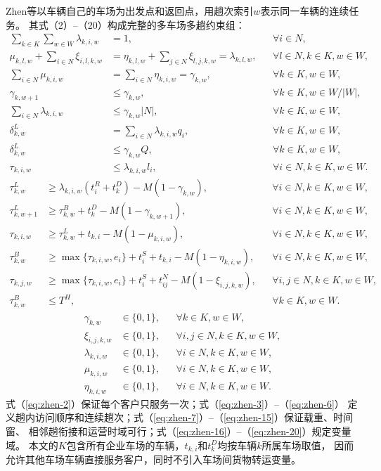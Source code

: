 Zhen等\cite{ref:44}以车辆自己的车场为出发点和返回点，用趟次索引$w$表示同一车辆的连续任务。
其式（2）--（20）构成完整的多车场多趟约束组：
\begin{align}
\sum_{k\in K}\sum_{w\in W}\lambda_{k,i,w}&=1,
&&\forall i\in N,
\label{eq:zhen-2}\\
\mu_{k,l,w}+\sum_{i\in N}\xi_{i,l,k,w}
&=\eta_{k,l,w}+\sum_{j\in N}\xi_{l,j,k,w}
=\lambda_{k,l,w},
&&\forall l\in N,k\in K,w\in W,
\label{eq:zhen-3}\\
\sum_{i\in N}\mu_{k,i,w}
&=\sum_{i\in N}\eta_{k,i,w}=\gamma_{k,w},
&&\forall k\in K,w\in W,
\label{eq:zhen-4}\\
\gamma_{k,w+1}&\le\gamma_{k,w},
&&\forall k\in K,w\in W/|W|,
\label{eq:zhen-5}\\
\sum_{i\in N}\lambda_{k,i,w}&\le\gamma_{k,w}|N|,
&&\forall k\in K,w\in W,
\label{eq:zhen-6}\\
\delta_{k,w}^{L}&=\sum_{i\in N}\lambda_{k,i,w}q_i,
&&\forall k\in K,w\in W,
\label{eq:zhen-7}\\
\delta_{k,w}^{L}&\le\gamma_{k,w}Q,
&&\forall k\in K,w\in W,
\label{eq:zhen-8}\\
\tau_{k,i,w}&\le\lambda_{k,i,w}l_i,
&&\forall i\in N,k\in K,w\in W.
\label{eq:zhen-9}
\end{align}
\begin{align}
\tau_{k,w}^{L}&\ge\lambda_{k,i,w}(t_i^{R}+t_k^{D})-M(1-\gamma_{k,w}),
&&\forall i\in N,k\in K,w\in W,
\label{eq:zhen-10}\\
\tau_{k,w+1}^{L}&\ge\tau_{k,w}^{B}+t_k^{D}-M(1-\gamma_{k,w+1}),
&&\forall i\in N,k\in K,w\in W,
\label{eq:zhen-11}\\
\tau_{k,i,w}&\ge\tau_{k,w}^{L}+t_{k,i}-M(1-\mu_{k,i,w}),
&&\forall i\in N,k\in K,w\in W,
\label{eq:zhen-12}\\
\tau_{k,w}^{B}&\ge\max\{\tau_{k,i,w},e_i\}+t_i^{S}+t_{k,i}-M(1-\eta_{k,i,w}),
&&\forall i\in N,k\in K,w\in W,
\label{eq:zhen-13}\\
\tau_{k,j,w}&\ge\max\{\tau_{k,i,w},e_i\}+t_i^{S}+t_{ij}^{N}-M(1-\xi_{i,j,k,w}),
&&\forall i,j\in N,k\in K,w\in W,
\label{eq:zhen-14}\\
\tau_{k,w}^{B}&\le T^{H},
&&\forall k\in K,w\in W.
\label{eq:zhen-15}
\end{align}
\begin{align}
\gamma_{k,w}&\in\{0,1\},
&&\forall k\in K,w\in W,
\label{eq:zhen-16}\\
\xi_{i,j,k,w}&\in\{0,1\},
&&\forall i,j\in N,k\in K,w\in W,
\label{eq:zhen-17}\\
\lambda_{k,i,w}&\in\{0,1\},
&&\forall i\in N,k\in K,w\in W,
\label{eq:zhen-18}\\
\mu_{k,i,w}&\in\{0,1\},
&&\forall i\in N,k\in K,w\in W,
\label{eq:zhen-19}\\
\eta_{k,i,w}&\in\{0,1\},
&&\forall i\in N,k\in K,w\in W.
\label{eq:zhen-20}
\end{align}
式（\ref{eq:zhen-2}）保证每个客户只服务一次；式（\ref{eq:zhen-3}）--（\ref{eq:zhen-6}）
定义趟内访问顺序和连续趟次；式（\ref{eq:zhen-7}）--（\ref{eq:zhen-15}）保证载重、时间窗、
相邻趟衔接和运营时域可行；式（\ref{eq:zhen-16}）--（\ref{eq:zhen-20}）规定变量域。
本文的$K$包含所有企业车场的车辆，$t_{k,i}$和$t_k^D$均按车辆$k$所属车场取值，
因而允许其他车场车辆直接服务客户，同时不引入车场间货物转运变量。

